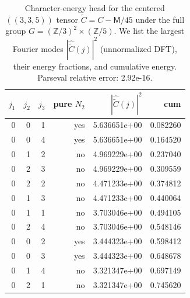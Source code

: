 \begin{table}[H]
\centering
\scriptsize
\setlength{\tabcolsep}{6pt}
\caption{Character-energy head for the centered $((3,3,5))$ tensor $\widetilde C=C-\mathsf{M}/45$ under the full group $G=(\mathbb{Z}/3)^2\times(\mathbb{Z}/5)$. We list the largest Fourier modes $|\widehat{\widetilde C}(j)|^2$ (unnormalized DFT), their energy fractions, and cumulative energy. Parseval relative error: 2.92e-16.}
\label{tab:arity_335_character_energy_head}
\begin{tabular}{r r r r r r}
\toprule
$j_1$ & $j_2$ & $j_3$ & pure $N_2$ & $|\widehat{\widetilde C}(j)|^2$ & cum\\
\midrule
0 & 0 & 1 & yes & 5.636651e+00 & 0.082260\\
0 & 0 & 4 & yes & 5.636651e+00 & 0.164520\\
0 & 1 & 2 & no & 4.969229e+00 & 0.237040\\
0 & 2 & 3 & no & 4.969229e+00 & 0.309559\\
0 & 2 & 2 & no & 4.471233e+00 & 0.374812\\
0 & 1 & 3 & no & 4.471233e+00 & 0.440064\\
0 & 1 & 1 & no & 3.703046e+00 & 0.494105\\
0 & 2 & 4 & no & 3.703046e+00 & 0.548146\\
0 & 0 & 2 & yes & 3.444323e+00 & 0.598412\\
0 & 0 & 3 & yes & 3.444323e+00 & 0.648678\\
0 & 1 & 4 & no & 3.321347e+00 & 0.697149\\
0 & 2 & 1 & no & 3.321347e+00 & 0.745620\\
\bottomrule
\end{tabular}
\end{table}

